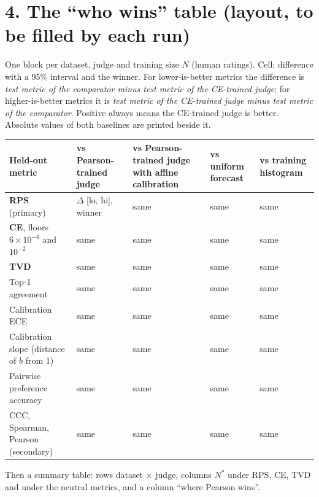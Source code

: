 \documentclass[10.5pt]{article}
\newcommand{\ra}{\raggedright\arraybackslash}
\begin{document}
\section*{4. The ``who wins'' table (layout, to be filled by each run)}
One block per dataset, judge and training size $N$ (human ratings). Cell: difference with a 95\% interval and the winner. For lower-is-better metrics the difference is \emph{test metric of the comparator minus test metric of the CE-trained judge}; for higher-is-better metrics it is \emph{test metric of the CE-trained judge minus test metric of the comparator}. Positive always means the CE-trained judge is better. Absolute values of both baselines are printed beside it.

{\small\begin{longtable}{@{}>{\ra}p{3.0cm}>{\ra}p{2.5cm}>{\ra}p{3.0cm}>{\ra}p{2.5cm}>{\ra}p{2.5cm}@{}}
\toprule
Held-out metric & vs Pearson-trained judge & vs Pearson-trained judge with affine calibration & vs uniform forecast & vs training histogram\\
\midrule
\textbf{RPS} (primary) & $\Delta$ [lo, hi], winner & same & same & same\\
\textbf{CE}, floors $6\times10^{-6}$ and $10^{-2}$ & same & same & same & same\\
\textbf{TVD} & same & same & same & same\\
Top-1 agreement & same & same & same & same\\
Calibration ECE & same & same & same & same\\
Calibration slope (distance of $b$ from 1) & same & same & same & same\\
Pairwise preference accuracy & same & same & same & same\\
CCC, Spearman, Pearson (secondary) & same & same & same & same\\
\bottomrule
\end{longtable}}
Then a summary table: rows dataset $\times$ judge, columns $N^\ast$ under RPS, CE, TVD and under the neutral metrics, and a column ``where Pearson wins''.
\end{document}
